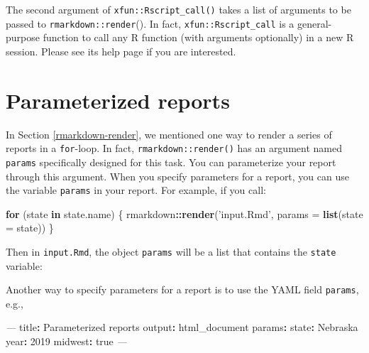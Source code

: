 \documentclass[
  11pt,
]{krantz}
\newenvironment{Shaded}{\begin{snugshade}}{\end{snugshade}}
\newcommand{\AttributeTok}[1]{\textcolor[rgb]{0.61,0.61,0.61}{#1}}
\newcommand{\BaseNTok}[1]{\textcolor[rgb]{0.06,0.06,0.06}{#1}}
\newcommand{\CharTok}[1]{\textcolor[rgb]{0.5,0.5,0.5}{#1}}
\newcommand{\ControlFlowTok}[1]{\textcolor[rgb]{0.27,0.27,0.27}{\textbf{#1}}}
\newcommand{\DataTypeTok}[1]{\textcolor[rgb]{0.27,0.27,0.27}{#1}}
\newcommand{\DecValTok}[1]{\textcolor[rgb]{0.06,0.06,0.06}{#1}}
\newcommand{\FunctionTok}[1]{\textcolor[rgb]{0,0,0}{#1}}
\newcommand{\KeywordTok}[1]{\textcolor[rgb]{0.27,0.27,0.27}{\textbf{#1}}}
\newcommand{\NormalTok}[1]{#1}
\newcommand{\OperatorTok}[1]{\textcolor[rgb]{0.43,0.43,0.43}{\textbf{#1}}}
\newcommand{\PreprocessorTok}[1]{\textcolor[rgb]{0.37,0.37,0.37}{\textit{#1}}}
\newcommand{\StringTok}[1]{\textcolor[rgb]{0.5,0.5,0.5}{#1}}
\begin{document}
The second argument of \texttt{xfun::Rscript\_call()} takes a list of arguments to be passed to \texttt{rmarkdown::render}(). In fact, \texttt{xfun::Rscript\_call} is a general-purpose function to call any R function (with arguments optionally) in a new R session. Please see its help page if you are interested.

\hypertarget{parameterized-reports}{%
\section{Parameterized reports}\label{parameterized-reports}}

In Section \ref{rmarkdown-render}, we mentioned one way to render a series of reports in a \texttt{for}-loop. In fact, \texttt{rmarkdown::render()} has an argument named \texttt{params} specifically designed for this task. You can parameterize your report through this argument. When you specify parameters for a report, you can use the variable \texttt{params} in your report. For example, if you call:

\begin{Shaded}
\begin{Highlighting}[]
\ControlFlowTok{for}\NormalTok{ (state }\ControlFlowTok{in}\NormalTok{ state.name) \{}
\NormalTok{  rmarkdown}\OperatorTok{::}\KeywordTok{render}\NormalTok{(}\StringTok{'input.Rmd'}\NormalTok{, }\DataTypeTok{params =} \KeywordTok{list}\NormalTok{(}\DataTypeTok{state =}\NormalTok{ state))}
\NormalTok{\}}
\end{Highlighting}
\end{Shaded}

Then in \texttt{input.Rmd}, the object \texttt{params} will be a list that contains the \texttt{state} variable:

\begin{Shaded}
\end{Shaded}

Another way to specify parameters for a report is to use the YAML field \texttt{params}, e.g.,

\begin{Shaded}
\begin{Highlighting}[]
\PreprocessorTok{---}
\FunctionTok{title}\KeywordTok{:}\AttributeTok{ Parameterized reports}
\FunctionTok{output}\KeywordTok{:}\AttributeTok{ html_document}
\FunctionTok{params}\KeywordTok{:}
\AttributeTok{  }\FunctionTok{state}\KeywordTok{:}\AttributeTok{ Nebraska}
\AttributeTok{  }\FunctionTok{year}\KeywordTok{:}\AttributeTok{ }\DecValTok{2019}
\AttributeTok{  }\FunctionTok{midwest}\KeywordTok{:}\AttributeTok{ }\CharTok{true}
\PreprocessorTok{---}
\end{Highlighting}
\end{Shaded}
\end{document}
